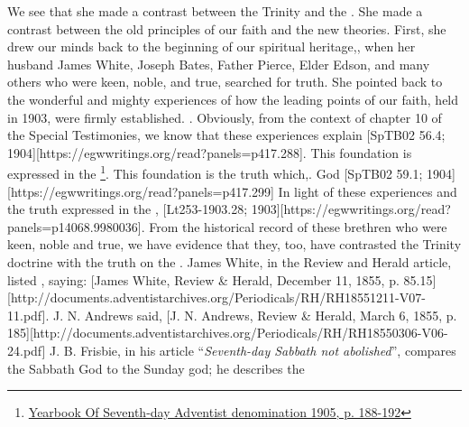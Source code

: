 We see that she made a contrast between the Trinity and the . She made a contrast between the old principles of our faith and the new theories. First, she drew our minds back to the beginning of our spiritual heritage,, when her husband James White, Joseph Bates, Father Pierce, Elder Edson, and many others who were keen, noble, and true, searched for truth. She pointed back to the wonderful and mighty experiences of how the leading points of our faith, held in 1903, were firmly established.   . Obviously, from the context of chapter 10 of the Special Testimonies, we know that these experiences explain [SpTB02 56.4; 1904][https://egwwritings.org/read?panels=p417.288]. This foundation is expressed in the \footnote{\href{https://static1.squarespace.com/static/554c4998e4b04e89ea0c4073/t/59d17e24c027d84167e17617/1506901547915/SDA-YB1905+\%28P.+188-192\%29.pdf}{Yearbook Of Seventh-day Adventist denomination 1905, p. 188-192}}. This foundation is the truth which,. God [SpTB02 59.1; 1904][https://egwwritings.org/read?panels=p417.299] In light of these experiences and the truth expressed in the , [Lt253-1903.28; 1903][https://egwwritings.org/read?panels=p14068.9980036]. From the historical record of these brethren who were keen, noble and true, we have evidence that they, too, have contrasted the Trinity doctrine with the truth on the . James White, in the Review and Herald article, listed , saying: [James White, Review \& Herald, December 11, 1855, p. 85.15][http://documents.adventistarchives.org/Periodicals/RH/RH18551211-V07-11.pdf]. J. N. Andrews said, [J. N. Andrews, Review \& Herald, March 6, 1855, p. 185][http://documents.adventistarchives.org/Periodicals/RH/RH18550306-V06-24.pdf] J. B. Frisbie, in his article “\textit{Seventh-day Sabbath not abolished}”, compares the Sabbath God to the Sunday god; he describes the 